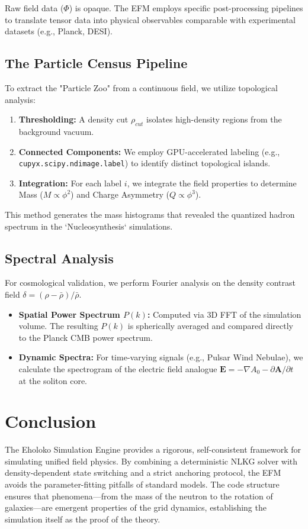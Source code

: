 \documentclass[11pt, twoside]{article}
\begin{document}
Raw field data ($\Phi$) is opaque. The EFM employs specific post-processing pipelines to translate tensor data into physical observables comparable with experimental datasets (e.g., Planck, DESI).

\subsection{The Particle Census Pipeline}
To extract the "Particle Zoo" from a continuous field, we utilize topological analysis:
\begin{enumerate}
    \item \textbf{Thresholding:} A density cut $\rho_{cut}$ isolates high-density regions from the background vacuum.
    \item \textbf{Connected Components:} We employ GPU-accelerated labeling (e.g., \texttt{cupyx.scipy.ndimage.label}) to identify distinct topological islands.
    \item \textbf{Integration:} For each label $i$, we integrate the field properties to determine Mass ($M \propto \phi^2$) and Charge Asymmetry ($Q \propto \phi^3$).
\end{enumerate}
This method generates the mass histograms that revealed the quantized hadron spectrum in the `Nucleosynthesis` simulations.

\subsection{Spectral Analysis}
For cosmological validation, we perform Fourier analysis on the density contrast field $\delta = (\rho - \bar{\rho})/\bar{\rho}$.
\begin{itemize}
    \item \textbf{Spatial Power Spectrum $P(k)$:} Computed via 3D FFT of the simulation volume. The resulting $P(k)$ is spherically averaged and compared directly to the Planck CMB power spectrum.
    \item \textbf{Dynamic Spectra:} For time-varying signals (e.g., Pulsar Wind Nebulae), we calculate the spectrogram of the electric field analogue $\mathbf{E} = -\nabla A_0 - \partial \mathbf{A}/\partial t$ at the soliton core.
\end{itemize}

\section{Conclusion}

The Eholoko Simulation Engine provides a rigorous, self-consistent framework for simulating unified field physics. By combining a deterministic NLKG solver with density-dependent state switching and a strict anchoring protocol, the EFM avoids the parameter-fitting pitfalls of standard models. The code structure ensures that phenomena—from the mass of the neutron to the rotation of galaxies—are emergent properties of the grid dynamics, establishing the simulation itself as the proof of the theory.
\end{document}
